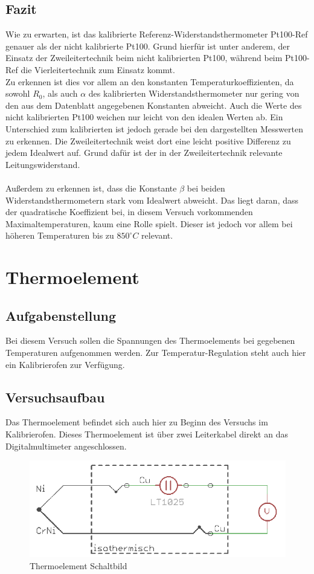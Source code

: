 \documentclass[a4paper,11pt,oneside]{article}
\begin{document}
\subsection{Fazit}
Wie zu erwarten, ist das kalibrierte Referenz-Widerstandsthermometer Pt100-Ref genauer als der nicht kalibrierte Pt100. Grund hierfür ist unter anderem, der Einsatz der Zweileitertechnik beim nicht kalibrierten Pt100, während beim Pt100-Ref die Vierleitertechnik zum Einsatz kommt. \\
Zu erkennen ist dies vor allem an den konstanten Temperaturkoeffizienten, da sowohl $R_0$, als auch $\alpha$ des kalibrierten Widerstandsthermometer nur gering von den aus dem Datenblatt angegebenen Konstanten abweicht. Auch die Werte des nicht kalibrierten Pt100 weichen nur leicht von den idealen Werten ab. Ein Unterschied zum kalibrierten ist jedoch gerade bei den dargestellten Messwerten zu erkennen. Die Zweileitertechnik weist dort eine leicht positive Differenz zu jedem Idealwert auf. Grund dafür ist der in der Zweileitertechnik relevante Leitungswiderstand.\\\\
Außerdem zu erkennen ist, dass die Konstante $\beta$ bei beiden Widerstandsthermometern stark vom Idealwert abweicht. Das liegt daran, dass der quadratische Koeffizient bei, in diesem Versuch vorkommenden Maximaltemperaturen, kaum eine Rolle spielt. Dieser ist jedoch vor allem bei höheren Temperaturen bis zu $850^\circ C$ relevant. 

\section{Thermoelement}
\subsection{Aufgabenstellung}
Bei diesem Versuch sollen die Spannungen des Thermoelements bei gegebenen Temperaturen aufgenommen werden. Zur Temperatur-Regulation steht auch hier ein Kalibrierofen zur Verfügung. 
\subsection{Versuchsaufbau}
Das Thermoelement befindet sich auch hier zu Beginn des Versuchs im Kalibrierofen. Dieses Thermoelement ist über zwei Leiterkabel direkt an das Digitalmultimeter angeschlossen. \\
\begin{figure}[h]
\centering
\includegraphics[scale=0.7]{Bilder/Aufg2Schaltbild1.png}
\caption{Thermoelement Schaltbild}
\end{figure}
\end{document}
